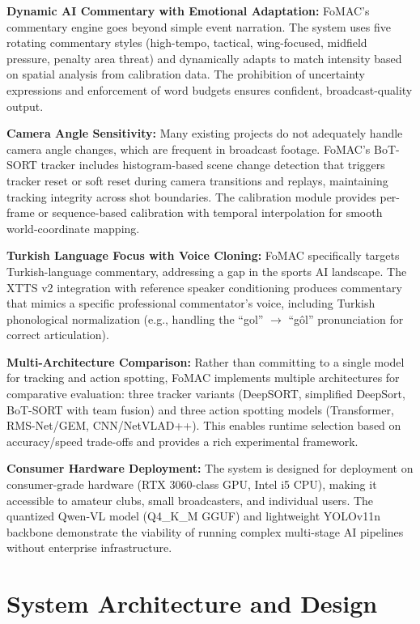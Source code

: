 \documentclass[10pt,twocolumn,a4paper]{article}
\begin{document}
\textbf{Dynamic AI Commentary with Emotional Adaptation:} FoMAC's commentary engine goes beyond simple event narration. The system uses five rotating commentary styles (high-tempo, tactical, wing-focused, midfield pressure, penalty area threat) and dynamically adapts to match intensity based on spatial analysis from calibration data. The prohibition of uncertainty expressions and enforcement of word budgets ensures confident, broadcast-quality output.

\textbf{Camera Angle Sensitivity:} Many existing projects do not adequately handle camera angle changes, which are frequent in broadcast footage. FoMAC's BoT-SORT tracker includes histogram-based scene change detection that triggers tracker reset or soft reset during camera transitions and replays, maintaining tracking integrity across shot boundaries. The calibration module provides per-frame or sequence-based calibration with temporal interpolation for smooth world-coordinate mapping.

\textbf{Turkish Language Focus with Voice Cloning:} FoMAC specifically targets Turkish-language commentary, addressing a gap in the sports AI landscape. The XTTS v2 integration with reference speaker conditioning produces commentary that mimics a specific professional commentator's voice, including Turkish phonological normalization (e.g., handling the ``gol'' $\rightarrow$ ``g\^{o}l'' pronunciation for correct articulation).

\textbf{Multi-Architecture Comparison:} Rather than committing to a single model for tracking and action spotting, FoMAC implements multiple architectures for comparative evaluation: three tracker variants (DeepSORT, simplified DeepSort, BoT-SORT with team fusion) and three action spotting models (Transformer, RMS-Net/GEM, CNN/NetVLAD++). This enables runtime selection based on accuracy/speed trade-offs and provides a rich experimental framework.

\textbf{Consumer Hardware Deployment:} The system is designed for deployment on consumer-grade hardware (RTX 3060-class GPU, Intel i5 CPU), making it accessible to amateur clubs, small broadcasters, and individual users. The quantized Qwen-VL model (Q4\_K\_M GGUF) and lightweight YOLOv11n backbone demonstrate the viability of running complex multi-stage AI pipelines without enterprise infrastructure.

\section{System Architecture and Design}
\end{document}
